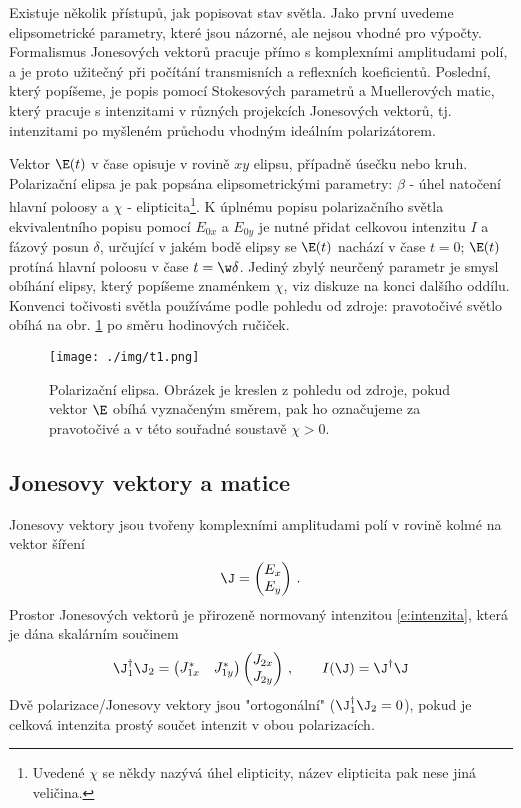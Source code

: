 Existuje několik přístupů, jak popisovat stav světla. Jako první uvedeme elipsometrické parametry, které jsou názorné, ale nejsou vhodné pro výpočty.
Formalismus Jonesových vektorů pracuje přímo s komplexními amplitudami polí, a je proto užitečný při počítání transmisních a reflexních koeficientů.
Poslední, který popíšeme, je popis pomocí Stokesových parametrů a Muellerových matic, který pracuje s intenzitami v různých projekcích Jonesových vektorů, tj. intenzitami po myšleném průchodu vhodným ideálním polarizátorem.

Vektor $\E(t)$ v čase opisuje v rovině $xy$ elipsu, případně úsečku nebo kruh\cite{Bornwolf}.
Polarizační elipsa je pak popsána elipsometrickými parametry: $\beta$ - úhel natočení hlavní poloosy a $\chi$ - elipticita\footnote{Uvedené $\chi$ se někdy nazývá úhel elipticity, název elipticita pak nese jiná veličina.}.
K úplnému popisu polarizačního světla ekvivalentního popisu pomocí $E_{0x}$ a $E_{0y}$ je nutné přidat celkovou intenzitu $I$ a fázový posun $\delta$, určující v jakém bodě elipsy se $\E(t)$ nachází v čase $t=0$; $\E(t)$ protíná hlavní poloosu v čase $t=\w \delta$.
Jediný zbylý neurčený parametr je smysl obíhání elipsy, který popíšeme znaménkem $\chi$, viz diskuze na konci dalšího oddílu.
Konvenci točivosti světla používáme podle pohledu od zdroje: pravotočivé světlo obíhá na obr. \ref{f:pol_elipsa} po směru hodinových ručiček.

\begin{figure}\centering
\texttt{[image: ./img/t1.png]}
\caption{Polarizační elipsa. Obrázek je kreslen z pohledu od zdroje, pokud vektor $\E$ obíhá vyznačeným směrem, pak ho označujeme za pravotočivé a v této souřadné soustavě $\chi>0$.}\label{f:pol_elipsa}
\end{figure}

\subsection{Jonesovy vektory a matice \cite{Jones}}
Jonesovy vektory jsou tvořeny komplexními amplitudami polí v rovině kolmé na vektor šíření
\begin{equation}
\J=\begin{pmatrix} E_{x} \\ E_{y} \end{pmatrix} \,.
\end{equation}
Prostor Jonesových vektorů je přirozeně normovaný intenzitou \eqref{e:intenzita}, která je dána skalárním součinem
\begin{equation}
\J_1^\dagger \J_2=
\begin{pmatrix}
J_{1x}^* & J_{1y}^*
\end{pmatrix}
\begin{pmatrix}
J_{2x} \\ J_{2y}
\end{pmatrix}
\,, \qquad I(\J)=\J^\dagger \J
\end{equation}
Dvě polarizace/Jonesovy vektory jsou "ortogonální" ($\J_1^\dagger \J_2=0$), pokud je celková intenzita prostý součet intenzit v obou polarizacích.

